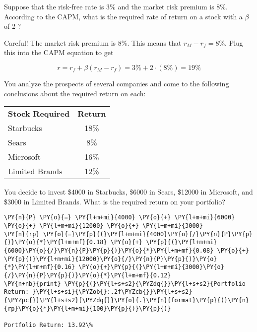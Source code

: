 \begin{Exercise}[title={(CAPM Practicle Application I)}]
Suppose that the risk-free rate is 3\% and the market risk premium is 8\%. According to the CAPM, what is the required rate of return on a stock with a $\beta$ of 2 ?
\end{Exercise}
\begin{Answer}
Careful! The market risk premium is 8\%. This means that $r_M - r_f  = 8\%$. Plug this into the CAPM equation to get

\[r = r_f + \beta(r_M - r_f) = 3\% + 2\cdot(8\%) =19\%\]
\end{Answer}

\begin{Exercise}[title={(CAPM Practicle Application II)}]
You analyze the prospects of several companies and come to the following conclusions about the required return on each:

\begin{center}
\begin{tabular}{lc}
\textbf{Stock Required} & \textbf{Return} \\
Starbucks &18\% \\
Sears &8\% \\
Microsoft &16\% \\
Limited Brands &12\% \\
\end{tabular}
\end{center}

You decide to invest \$4000 in Starbucks, \$6000 in Sears, \$12000 in Microsoft, and \$3000 in Limited Brands. What is the required return on your portfolio?
\end{Exercise}
\begin{Answer}
\begin{tcolorbox}[size=fbox, boxrule=1pt, colback=cellbackground, colframe=cellborder]
\begin{Verbatim}[commandchars=\\\{\}]
\PY{n}{P} \PY{o}{=} \PY{l+m+mi}{4000} \PY{o}{+} \PY{l+m+mi}{6000} \PY{o}{+} \PY{l+m+mi}{12000} \PY{o}{+} \PY{l+m+mi}{3000}
\PY{n}{rp} \PY{o}{=}\PY{p}{(}\PY{l+m+mi}{4000}\PY{o}{/}\PY{n}{P}\PY{p}{)}\PY{o}{*}\PY{l+m+mf}{0.18} \PY{o}{+} \PY{p}{(}\PY{l+m+mi}{6000}\PY{o}{/}\PY{n}{P}\PY{p}{)}\PY{o}{*}\PY{l+m+mf}{0.08} \PY{o}{+} \PY{p}{(}\PY{l+m+mi}{12000}\PY{o}{/}\PY{n}{P}\PY{p}{)}\PY{o}{*}\PY{l+m+mf}{0.16} \PY{o}{+}\PY{p}{(}\PY{l+m+mi}{3000}\PY{o}{/}\PY{n}{P}\PY{p}{)}\PY{o}{*}\PY{l+m+mf}{0.12}
\PY{n+nb}{print} \PY{p}{(}\PY{l+s+s2}{\PYZdq{}}\PY{l+s+s2}{Portfolio Return: }\PY{l+s+si}{\PYZob{}:.2f\PYZcb{}}\PY{l+s+s2}{\PYZpc{}}\PY{l+s+s2}{\PYZdq{}}\PY{o}{.}\PY{n}{format}\PY{p}{(}\PY{n}{rp}\PY{o}{*}\PY{l+m+mi}{100}\PY{p}{)}\PY{p}{)}
	
Portfolio Return: 13.92\%
\end{Verbatim}
\end{tcolorbox}
\end{Answer}	

